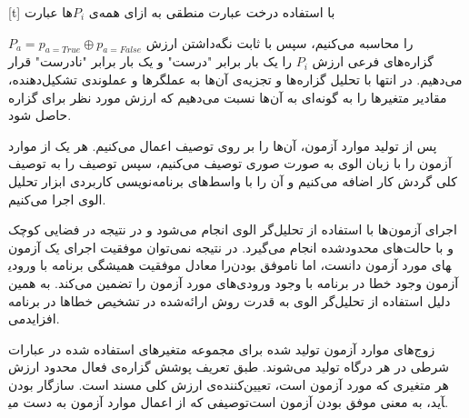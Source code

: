 [t]
\vspace{0.5em}
با استفاده درخت عبارت منطقی به ازای همه‌ی $P_i$‌ها عبارت
 
$P_a = p_{a=True}\oplus p_{a=False}$\newline
را محاسبه می‌کنیم، سپس با ثابت نگه‌داشتن ارزش گزاره‌های فرعی ارزش $P_i$ را یک بار برابر "درست" و یک بار برابر "نادرست" قرار می‌دهیم. در انتها با تحلیل گزاره‌ها و تجزیه‌ی آن‌ها به عملگرها و عملوندی تشکیل‌دهنده، مقادیر متغیرها را به گونه‌ای به آن‌ها نسبت می‌دهیم که ارزش مورد نظر برای گزاره حاصل شود.

پس از تولید موارد آزمون، آن‌ها را بر روی توصیف اعمال می‌کنیم. هر یک از موارد آزمون را با زبان الوی به صورت صوری توصیف می‌کنیم، سپس توصیف را به توصیف کلی گردش کار اضافه می‌کنیم و آن را با واسط‌های برنامه‌نویسی کاربردی ابزار تحلیل الوی اجرا می‌کنیم. 

اجرای آزمون‌ها با استفاده از تحلیل‌گر الوی انجام می‌شود و در نتیجه در فضایی کوچک و با حالت‌های محدود‌شده انجام می‌گیرد. در نتیجه نمی‌توان موفقیت اجرای یک آزمون را معادل موفقیت همیشگی برنامه با ورودی‎های مورد آزمون دانست، اما ناموفق بودن آزمون وجود خطا در برنامه با وجود ورودی‌های مورد آزمون را تضمین می‌کند. به همین دلیل استفاده از تحلیل‌گر الوی به قدرت روش ارائه‌شده در تشخیص خطاها در برنامه می‎‌افزاید.

زوج‌های موارد آزمون تولید شده برای مجموعه متغیرهای استفاده شده در عبارات شرطی در هر درگاه تولید می‌شوند. طبق تعریف پوشش گزاره‌ی فعال محدود ارزش هر متغیری که مورد آزمون است، تعیین‌کننده‌ی ارزش کلی مسند است. سازگار بودن توصیفی که از اعمال موارد آزمون به دست می‎آید، به معنی موفق بودن آزمون است.\newline\newline

